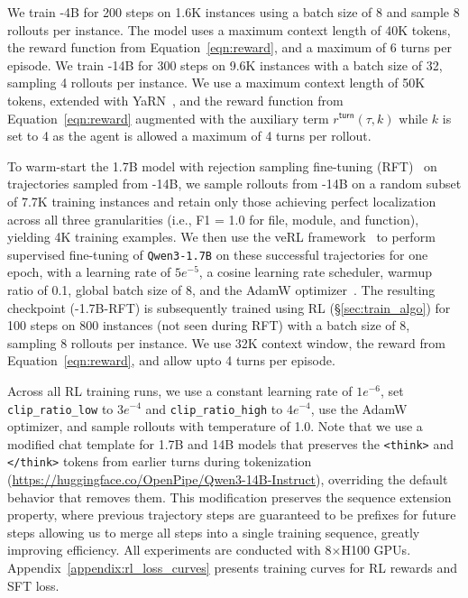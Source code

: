 We train \methodname-4B for 200 steps on 1.6K instances using a batch size of 8 and sample 8 rollouts per instance. The model uses a maximum context length of 40K tokens, the reward function from Equation~\ref{eqn:reward}, and a maximum of 6 turns per episode. We train \methodname-14B for 300 steps on 9.6K instances with a batch size of 32, sampling 4 rollouts per instance. We use a maximum context length of 50K tokens, extended with YaRN~\citep{peng2026yarnefficientcontextwindow}, and the reward function from Equation~\ref{eqn:reward} augmented with the auxiliary term $r^{\mathsf{turn}}(\tau, k)$ while $k$ is set to 4 as the agent is allowed a maximum of 4 turns per rollout.

To warm-start the 1.7B model with rejection sampling fine-tuning (RFT)~\citep{yuan2023scalingrelationshiplearningmathematical} on trajectories sampled from \methodname-14B, we sample rollouts from \methodname-14B on a random subset of 7.7K training instances and retain only those achieving perfect localization across all three granularities (i.e., F1 = 1.0 for file, module, and function), yielding 4K training examples. We then use the veRL framework~\citep{Sheng_2025} to perform supervised fine-tuning of \texttt{Qwen3-1.7B} on these successful trajectories for one epoch, with a learning rate of $5e^{-5}$, a cosine learning rate scheduler, warmup ratio of 0.1, global batch size of 8, and the AdamW optimizer~\citep{loshchilov2019decoupledweightdecayregularization}. The resulting checkpoint (\methodname-1.7B-RFT) is subsequently trained using RL (\S\ref{sec:train_algo}) for 100 steps on 800 instances (not seen during RFT) with a batch size of 8, sampling 8 rollouts per instance. We use 32K context window, the reward from Equation~\ref{eqn:reward}, and allow upto 4 turns per episode.

Across all \methodname RL training runs, we use a constant learning rate of $1e^{-6}$, set \texttt{clip\_ratio\_low} to $3e^{-4}$ and \texttt{clip\_ratio\_high} to $4e^{-4}$, use the AdamW optimizer, and sample rollouts with temperature of 1.0. Note that we use a modified chat template for 1.7B and 14B models that preserves the \texttt{<think>} and \texttt{</think>} tokens from earlier turns during tokenization (\url{https://huggingface.co/OpenPipe/Qwen3-14B-Instruct}), overriding the default behavior that removes them. This modification preserves the sequence extension property, where previous trajectory steps are guaranteed to be prefixes for future steps allowing us to merge all steps into a single training sequence, greatly improving efficiency. All experiments are conducted with 8$\times$H100 GPUs. Appendix~\ref{appendix:rl_loss_curves} presents training curves for RL rewards and SFT loss.

